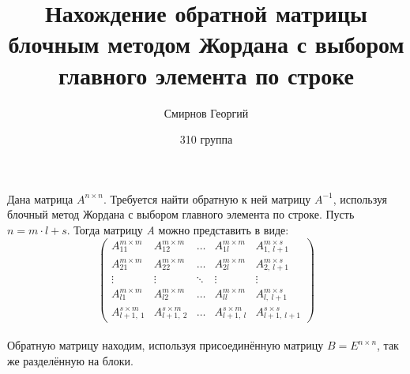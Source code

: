 \documentclass[14pt,a4paper, openany]{article}
\begin{document}
\title{\textbf {Нахождение обратной матрицы блочным методом Жордана с выбором главного элемента по строке} }
\author{Смирнов Георгий}
\date{310 группа}
\maketitle

Дана матрица $A^{n \times n}$. Требуется найти обратную к ней матрицу $A^{-1}$, используя блочный метод Жордана с выбором главного элемента по строке.
  Пусть $n = m \cdot l + s$. Тогда матрицу \textit{A} можно представить в виде:
$$
\left (
\begin{matrix} 
A_{11}^{m \times m} & A_{12}^{m \times m} & \ldots & A_{1l}^{m \times m} & A_{1,\ l+1}^{m \times s} \\
A_{21}^{m \times m} & A_{22}^{m \times m} & \ldots & A_{2l}^{m \times m} & A_{2,\ l+1}^{m \times s} \\
\vdots  & \vdots & \ddots & \vdots & \vdots \\
A_{l1}^{m \times m} & A_{l2}^{m \times m} & \ldots & A_{ll}^{m \times m} & A_{l,\ l+1}^{m \times s} \\
A_{l+1,\ 1}^{s \times m} & A_{l+1,\ 2}^{s \times m} & \ldots & A_{l+1,\ l}^{s \times m} & A_{l+1,\ l+1}^{s \times s}
\end{matrix}
\right )
$$ \\
Обратную матрицу находим, используя присоединённую матрицу $ B = E^{n \times n} $, так же разделённую на блоки.
\end{document}

